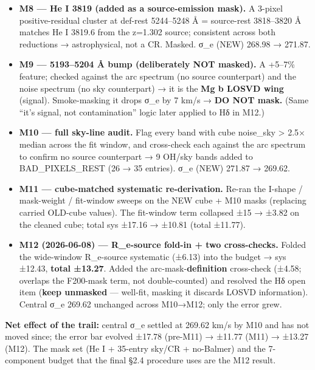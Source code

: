 \documentclass[
]{article}
\providecommand{\tightlist}{%
  \setlength{\itemsep}{0pt}\setlength{\parskip}{0pt}}
\newcommand{\BreakablePath}[1]{{\ttfamily\sloppy #1}}
\begin{document}
\begin{itemize}
\tightlist
\item
  \textbf{M8 --- He I 3819 (added as a source-emission mask).} A 3-pixel
  positive-residual cluster at def-rest 5244--5248 Å = source-rest
  3818--3820 Å matches He I 3819.6 from the z=1.302 source; consistent
  across both reductions → astrophysical, not a CR. Masked. σ\_e (NEW)
  268.98 → 271.87.
\item
  \textbf{M9 --- 5193--5204 Å bump (deliberately NOT masked).} A +5--7\%
  feature; checked against the arc spectrum (no source counterpart) and
  the noise spectrum (no sky counterpart) → it is the \textbf{Mg b LOSVD
  wing} (signal). Smoke-masking it drops σ\_e by 7 km/s → \textbf{DO NOT
  mask.} (Same ``it's signal, not contamination'' logic later applied to
  Hδ in M12.)
\item
  \textbf{M10 --- full sky-line audit.} Flag every band with cube
  \BreakablePath{noise\_\discretionary{}{}{}sky} \textgreater{} 2.5×
  median across the fit window, and cross-check each against the arc
  spectrum to confirm no source counterpart → 9 OH/sky bands added to
  \BreakablePath{BAD\_\discretionary{}{}{}PIXELS\_\discretionary{}{}{}REST}
  (26 → 35 entries). σ\_e (NEW) 271.87 → 269.62.
\item
  \textbf{M11 --- cube-matched systematic re-derivation.} Re-ran the
  I-shape / mask-weight / fit-window sweeps on the NEW cube + M10 masks
  (replacing carried OLD-cube values). The fit-window term collapsed ±15
  → ±3.82 on the cleaned cube; total sys ±17.16 → ±10.81 (total ±11.77).
\item
  \textbf{M12 (2026-06-08) --- R\_e-source fold-in + two cross-checks.}
  Folded the wide-window R\_e-source systematic (±6.13) into the budget
  → sys ±12.43, \textbf{total ±13.27}. Added the
  arc-mask-\textbf{definition} cross-check (±4.58; overlaps the
  F200-mask term, not double-counted) and resolved the Hδ open item
  (\textbf{keep unmasked} --- well-fit, masking it discards LOSVD
  information). Central σ\_e 269.62 unchanged across M10→M12; only the
  error grew.
\end{itemize}

\textbf{Net effect of the trail:} central σ\_e settled at 269.62 km/s by
M10 and has not moved since; the error bar evolved ±17.78 (pre-M11) →
±11.77 (M11) → ±13.27 (M12). The mask set (He I + 35-entry sky/CR +
no-Balmer) and the 7-component budget that the final §2.4 procedure uses
are the M12 result.
\end{document}
